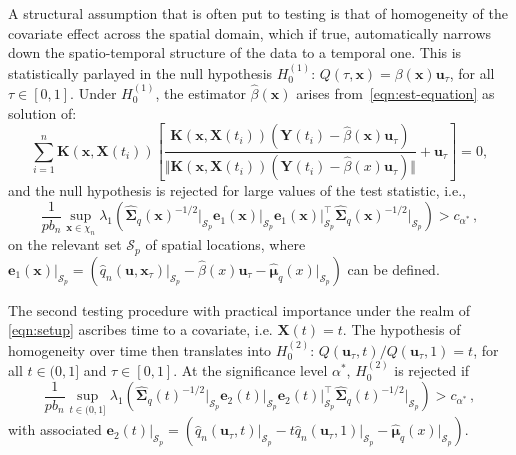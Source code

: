 \documentclass[aos]{imsart}
\theoremstyle{plain}
\theoremstyle{remark}
\newcommand{\Scal}{\mathcal{S}}
\newcommand{\bb}[1]{\boldsymbol{#1}}
\newcommand{\tr}{^{\intercal}}
\newcommand{\kernel}[1]{\bb{K}(\bb{x}, \bb{X}(#1))}
\newcommand{\cnam}[1]{\textcolor{mypurple}{#1}}
\begin{document}
\cnam{A structural assumption that is often put to testing is that of homogeneity of the covariate effect across the spatial domain, which if true, automatically narrows down the spatio-temporal structure of the data to a temporal one. This is statistically parlayed in the null hypothesis $H_0^{(1)}:\, Q(\tau, \bb{x}) = \beta(\bb{x}) \bb{u}_{\tau}$, for all $\tau \in [0, 1]$. Under $H_0^{(1)}$, the estimator $\widehat{\beta}(\bb{x})$ arises from~\eqref{eqn:est-equation} as solution of:}
\begin{equation*}
    \sum_{i=1}^n \kernel{t_i} \left[\dfrac{\kernel{t_i}(\bb{Y}(t_i) - \widehat{\beta}(\bb{x})\bb{u}_{\tau} )  }{ \Vert \kernel{t_i}(\bb{Y}(t_i) - \widehat{\beta}(x)\bb{u}_{\tau} ) \Vert } + \bb{u}_{\tau}\right] = 0,
\end{equation*}
and the null hypothesis is rejected for large values of the test statistic, i.e.,
\begin{equation*}
    \dfrac{1}{pb_n} \sup_{\bb{x} \in \chi_n} \lambda_1\left( \widehat{\bb{\Sigma}}_q(\bb{x})^{-1/2}\vert_{\Scal_p} \bb{e}_1(\bb{x})\vert_{\Scal_p}\bb{e}_1(\bb{x})\vert_{\Scal_p}\tr \widehat{\bb{\Sigma}}_q(\bb{x})^{-1/2}\vert_{\Scal_p} \right) > c_{\alpha^*}\, , 
\end{equation*}
on the relevant set $\Scal_p$ of spatial locations, where
$
    \bb{e}_1(\bb{x})\vert_{\Scal_p} = (\hat{q}_n(\bb{u} ,\bb{x}_{\tau})\vert_{\Scal_p} - \widehat{\beta}(x) \bb{u}_{\tau} - \widehat{\bb{\mu}}_q(x)\vert_{\Scal_p} )
$ can be defined.

\cnam{The second testing procedure with practical importance under the realm of \eqref{eqn:setup} ascribes time to a covariate, i.e. $\bb{X}(t) = t$. The hypothesis of homogeneity over time then translates into $H_0^{(2)}:\, Q(\bb{u}_{\tau}, t)/  Q( \bb{u}_{\tau}, 1) = t$, for all $t \in (0, 1]$ and $\tau \in [0, 1]$.} At the significance level $\alpha^*$, $H_0^{(2)}$ is rejected if
\begin{equation*}
    \dfrac{1}{pb_n} \sup_{t \in (0, 1]} \lambda_1\left( \widehat{\bb{\Sigma}}_q(t)^{-1/2}\vert_{\Scal_p} \bb{e}_2(t)\vert_{\Scal_p}\bb{e}_2(t)\vert_{\Scal_p}\tr \widehat{\bb{\Sigma}}_q(t)^{-1/2}\vert_{\Scal_p} \right) > c_{\alpha^*}\, , 
\end{equation*}
with associated $ \bb{e}_2(t)\vert_{\Scal_p} = (\hat{q}_n(\bb{u}_{\tau}, t)\vert_{\Scal_p} - t\hat{q}_n(\bb{u}_{\tau}, 1)\vert_{\Scal_p}  - \widehat{\bb{\mu}}_q(x)\vert_{\Scal_p} )$.



\end{document}
